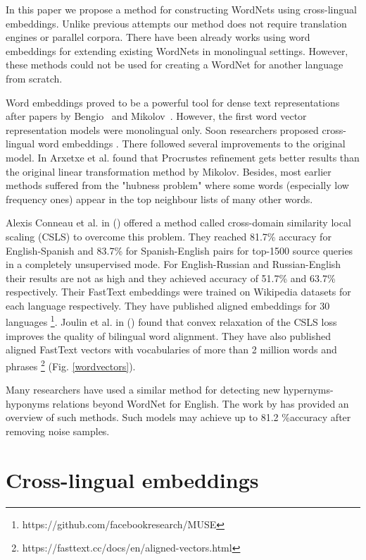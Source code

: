 \documentclass[conference]{IEEEtran}
\begin{document}
	In this paper we propose a method for constructing WordNets using cross-lingual embeddings. Unlike previous attempts our method does not require translation engines or parallel corpora. There have been already works using word embeddings for extending existing WordNets \cite{sand2017wordnet,tarouti} in monolingual settings. However, these methods could not be used for creating a WordNet for another language from scratch.
	
	Word embeddings proved to be a powerful tool for dense text representations after papers by Bengio~\cite{bengio} and Mikolov~\cite{mikolov-representations-2013}. However, the first word vector representation models were monolingual only. Soon researchers proposed cross-lingual word embeddings \cite{mikolov-parallel}. There followed several improvements to the original model. In \citeyear{artetxe2016learning} Arxetxe et al. found that Procrustes refinement gets better results than the original linear transformation method by Mikolov. Besides, most earlier methods suffered from the "hubness problem" where some words (especially low frequency ones) appear in the top neighbour lists of many other words.
	
	Alexis Conneau et al. in (\citeyear{muse}) offered a method called cross-domain similarity local scaling (CSLS) to overcome this problem. They reached 81.7\% accuracy for English-Spanish and 83.7\% for Spanish-English pairs for top-1500 source queries in a completely unsupervised mode. For English-Russian and Russian-English their results are not as high and they achieved accuracy of 51.7\% and 63.7\% respectively. Their FastText embeddings were trained on Wikipedia datasets for each language respectively. They have published aligned embeddings for 30 languages \footnote{https://github.com/facebookresearch/MUSE}. Joulin et al. in (\citeyear{joulin2018loss}) found that convex relaxation of the CSLS loss improves the quality of bilingual word alignment. They have also published aligned FastText vectors with vocabularies of more than 2 million words and phrases \footnote{https://fasttext.cc/docs/en/aligned-vectors.html} (Fig. \ref*{wordvectors}).
	
	Many researchers have used a similar method for detecting new hypernyms-hyponyms relations beyond WordNet for English. The work by \cite{sanchez2017well} has provided an overview of such methods. Such models may achieve up to 81.2 \%accuracy after removing noise samples.
	
	
	\section{Cross-lingual embeddings}
	
\end{document}
